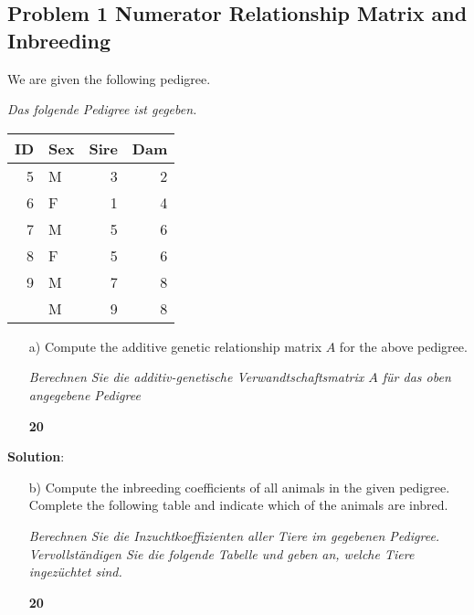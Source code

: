 \documentclass[
]{article}
\newcommand{\points}[1]
{\begin{flushright}\textbf{#1}\end{flushright}}
\newcommand{\solstart}
{\vspace{3ex}\textbf{Solution}:}
\begin{document}
\clearpage
\pagebreak

\hypertarget{problem-1-numerator-relationship-matrix-and-inbreeding}{%
\subsection{Problem 1 Numerator Relationship Matrix and
Inbreeding}\label{problem-1-numerator-relationship-matrix-and-inbreeding}}

We are given the following pedigree.

\textit{Das folgende Pedigree ist gegeben.}

\begin{center}

\begin{tabular}{rlrr}
\toprule
ID & Sex & Sire & Dam\\
\midrule
5 & M & 3 & 2\\
6 & F & 1 & 4\\
7 & M & 5 & 6\\
8 & F & 5 & 6\\
9 & M & 7 & 8\\
\addlinespace
10 & M & 9 & 8\\
\bottomrule
\end{tabular}
\end{center}

\begin{enumerate}
\item[a)] Compute the additive genetic relationship matrix $A$ for the above pedigree.

\textit{Berechnen Sie die additiv-genetische Verwandtschaftsmatrix $A$ für das oben angegebene Pedigree}
\points{20}
\end{enumerate}

\solstart

\clearpage
\pagebreak

\begin{enumerate}
\item[b)] Compute the inbreeding coefficients of all animals in the given pedigree. Complete the following table and indicate which of the animals are inbred.

\textit{Berechnen Sie die Inzuchtkoeffizienten aller Tiere im gegebenen Pedigree. Vervollständigen Sie die folgende Tabelle und geben an, welche Tiere ingezüchtet sind.}
\points{20}
\end{enumerate}

\vspace{3ex}
\end{document}
